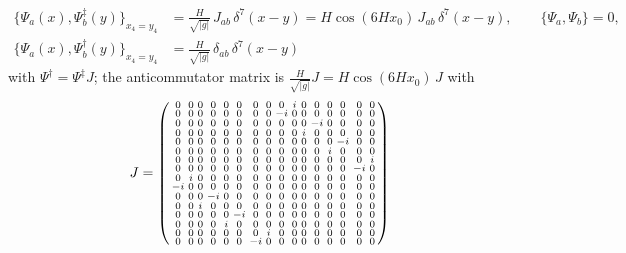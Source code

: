 \begin{align*}
\{\Psi_a(x),\Psi^{\ddagger}_b(y)\}_{x_4=y_4} &= \frac{H}{\sqrt{|g|}}\,J_{ab}\,\delta^7(x-y) = H \cos \left(6 H x_0\right)\,J_{ab}\,\delta^7(x-y), \qquad \{\Psi_a,\Psi_b\}=0, \\
\{\Psi_a(x),\Psi^{\dagger}_b(y)\}_{x_4=y_4} &= \frac{H}{\sqrt{|g|}}\,\delta_{ab}\,\delta^7(x-y)
\end{align*}
with $\Psi^\dagger = \Psi^\ddagger J$; the anticommutator matrix is $\frac{H}{\sqrt{|g|}}J = H \cos \left(6 H x_0\right)\,J$ with
\[ J = \setcounter{MaxMatrixCols}{16}
\left(\begin{smallmatrix}
0 & 0 & 0 & 0 & 0 & 0 & 0 & 0 & 0 & i & 0 & 0 & 0 & 0 & 0 & 0 \\
0 & 0 & 0 & 0 & 0 & 0 & 0 & 0 & -i & 0 & 0 & 0 & 0 & 0 & 0 & 0 \\
0 & 0 & 0 & 0 & 0 & 0 & 0 & 0 & 0 & 0 & 0 & -i & 0 & 0 & 0 & 0 \\
0 & 0 & 0 & 0 & 0 & 0 & 0 & 0 & 0 & 0 & i & 0 & 0 & 0 & 0 & 0 \\
0 & 0 & 0 & 0 & 0 & 0 & 0 & 0 & 0 & 0 & 0 & 0 & 0 & -i & 0 & 0 \\
0 & 0 & 0 & 0 & 0 & 0 & 0 & 0 & 0 & 0 & 0 & 0 & i & 0 & 0 & 0 \\
0 & 0 & 0 & 0 & 0 & 0 & 0 & 0 & 0 & 0 & 0 & 0 & 0 & 0 & 0 & i \\
0 & 0 & 0 & 0 & 0 & 0 & 0 & 0 & 0 & 0 & 0 & 0 & 0 & 0 & -i & 0 \\
0 & i & 0 & 0 & 0 & 0 & 0 & 0 & 0 & 0 & 0 & 0 & 0 & 0 & 0 & 0 \\
-i & 0 & 0 & 0 & 0 & 0 & 0 & 0 & 0 & 0 & 0 & 0 & 0 & 0 & 0 & 0 \\
0 & 0 & 0 & -i & 0 & 0 & 0 & 0 & 0 & 0 & 0 & 0 & 0 & 0 & 0 & 0 \\
0 & 0 & i & 0 & 0 & 0 & 0 & 0 & 0 & 0 & 0 & 0 & 0 & 0 & 0 & 0 \\
0 & 0 & 0 & 0 & 0 & -i & 0 & 0 & 0 & 0 & 0 & 0 & 0 & 0 & 0 & 0 \\
0 & 0 & 0 & 0 & i & 0 & 0 & 0 & 0 & 0 & 0 & 0 & 0 & 0 & 0 & 0 \\
0 & 0 & 0 & 0 & 0 & 0 & 0 & i & 0 & 0 & 0 & 0 & 0 & 0 & 0 & 0 \\
0 & 0 & 0 & 0 & 0 & 0 & -i & 0 & 0 & 0 & 0 & 0 & 0 & 0 & 0 & 0
\end{smallmatrix}\right) \]
